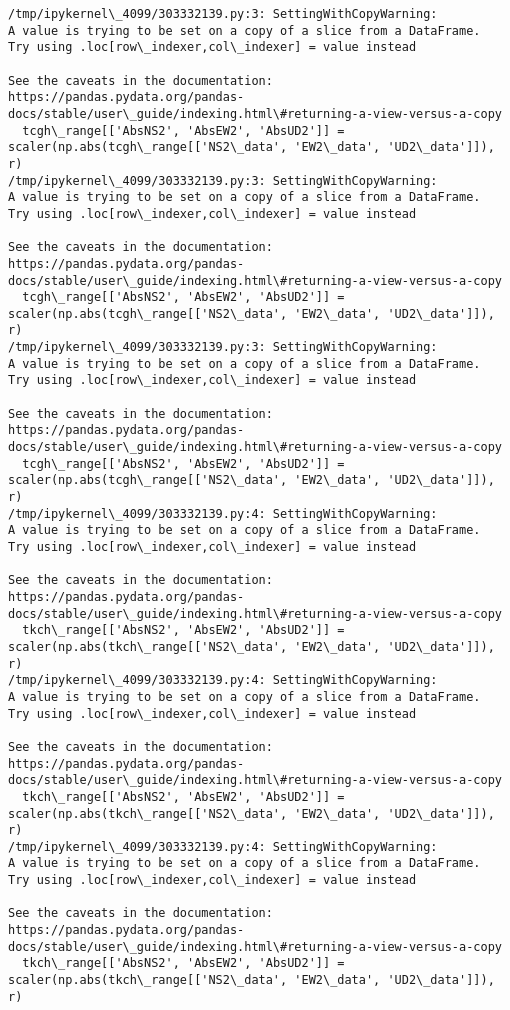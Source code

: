 \documentclass[11pt]{article}
\begin{document}
    \begin{Verbatim}[commandchars=\\\{\}]
/tmp/ipykernel\_4099/303332139.py:3: SettingWithCopyWarning:
A value is trying to be set on a copy of a slice from a DataFrame.
Try using .loc[row\_indexer,col\_indexer] = value instead

See the caveats in the documentation: https://pandas.pydata.org/pandas-
docs/stable/user\_guide/indexing.html\#returning-a-view-versus-a-copy
  tcgh\_range[['AbsNS2', 'AbsEW2', 'AbsUD2']] =
scaler(np.abs(tcgh\_range[['NS2\_data', 'EW2\_data', 'UD2\_data']]), r)
/tmp/ipykernel\_4099/303332139.py:3: SettingWithCopyWarning:
A value is trying to be set on a copy of a slice from a DataFrame.
Try using .loc[row\_indexer,col\_indexer] = value instead

See the caveats in the documentation: https://pandas.pydata.org/pandas-
docs/stable/user\_guide/indexing.html\#returning-a-view-versus-a-copy
  tcgh\_range[['AbsNS2', 'AbsEW2', 'AbsUD2']] =
scaler(np.abs(tcgh\_range[['NS2\_data', 'EW2\_data', 'UD2\_data']]), r)
/tmp/ipykernel\_4099/303332139.py:3: SettingWithCopyWarning:
A value is trying to be set on a copy of a slice from a DataFrame.
Try using .loc[row\_indexer,col\_indexer] = value instead

See the caveats in the documentation: https://pandas.pydata.org/pandas-
docs/stable/user\_guide/indexing.html\#returning-a-view-versus-a-copy
  tcgh\_range[['AbsNS2', 'AbsEW2', 'AbsUD2']] =
scaler(np.abs(tcgh\_range[['NS2\_data', 'EW2\_data', 'UD2\_data']]), r)
/tmp/ipykernel\_4099/303332139.py:4: SettingWithCopyWarning:
A value is trying to be set on a copy of a slice from a DataFrame.
Try using .loc[row\_indexer,col\_indexer] = value instead

See the caveats in the documentation: https://pandas.pydata.org/pandas-
docs/stable/user\_guide/indexing.html\#returning-a-view-versus-a-copy
  tkch\_range[['AbsNS2', 'AbsEW2', 'AbsUD2']] =
scaler(np.abs(tkch\_range[['NS2\_data', 'EW2\_data', 'UD2\_data']]), r)
/tmp/ipykernel\_4099/303332139.py:4: SettingWithCopyWarning:
A value is trying to be set on a copy of a slice from a DataFrame.
Try using .loc[row\_indexer,col\_indexer] = value instead

See the caveats in the documentation: https://pandas.pydata.org/pandas-
docs/stable/user\_guide/indexing.html\#returning-a-view-versus-a-copy
  tkch\_range[['AbsNS2', 'AbsEW2', 'AbsUD2']] =
scaler(np.abs(tkch\_range[['NS2\_data', 'EW2\_data', 'UD2\_data']]), r)
/tmp/ipykernel\_4099/303332139.py:4: SettingWithCopyWarning:
A value is trying to be set on a copy of a slice from a DataFrame.
Try using .loc[row\_indexer,col\_indexer] = value instead

See the caveats in the documentation: https://pandas.pydata.org/pandas-
docs/stable/user\_guide/indexing.html\#returning-a-view-versus-a-copy
  tkch\_range[['AbsNS2', 'AbsEW2', 'AbsUD2']] =
scaler(np.abs(tkch\_range[['NS2\_data', 'EW2\_data', 'UD2\_data']]), r)
    \end{Verbatim}
\end{document}
